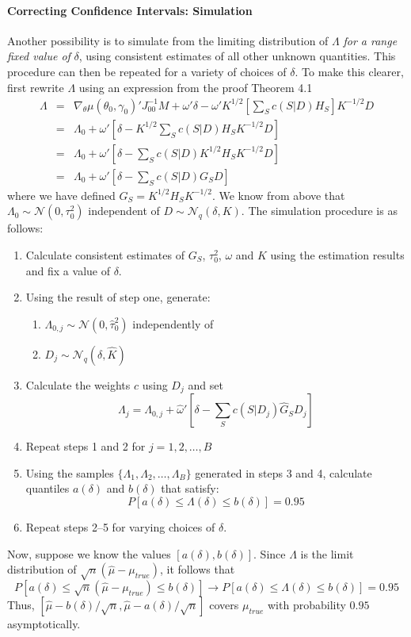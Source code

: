 \documentclass[12pt]{article}
\theoremstyle{definition}
\begin{document}
\paragraph{Correcting Confidence Intervals: Simulation} Another possibility is to simulate from the limiting distribution of $\Lambda$ \emph{for a range fixed value of} $\delta$, using consistent estimates of all other unknown quantities. This procedure can then be repeated for a variety of choices of $\delta$. To make this clearer, first rewrite $\Lambda$ using an expression from the proof Theorem 4.1
	\begin{eqnarray*}
		\Lambda &=&\nabla_{\theta}\mu(\theta_0, \gamma_0)'J_{00}^{-1}M+  \omega'\delta - \omega 'K^{1/2}\left[ \sum_S c(S|D)H_S\right] K^{-1/2}D \\
			&=& \Lambda_0 + \omega' \left[ \delta - K^{1/2} \sum_S c(S|D)H_S K^{-1/2}D \right]\\
			&=& \Lambda_0 + \omega' \left[ \delta - \sum_S c(S|D)K^{1/2} H_S K^{-1/2}D \right]\\
			&=& \Lambda_0 + \omega' \left[ \delta - \sum_S c(S|D)G_S D \right]
	\end{eqnarray*}
where we have defined $G_S = K^{1/2} H_S K^{-1/2}$. We know from above  that $\Lambda_0 \sim \mathcal{N}(0,\tau_0^2)$ independent of $D\sim \mathcal{N}_q(\delta,K)$. The simulation procedure is as follows:
		\begin{enumerate}
			\item Calculate consistent estimates of $G_S$, $\tau_0^2$, $\omega$ and $K$ using the estimation results and fix a value of $\delta$.
			\item Using the result of step one, generate:
				\begin{enumerate}
					\item $\Lambda_{0,j}\sim\mathcal{N}(0, \hat{\tau}^{2}_0)$ independently of
					\item  $D_j \sim \mathcal{N}_q(\delta, \hat{K})$
				\end{enumerate}
			\item Calculate the weights $c$ using $D_j$ and set 
				$$\Lambda_j = \Lambda_{0,j} + \hat{\omega}' \left[ \delta - \sum_S c(S|D_j)\hat{G}_S D_j \right]$$
		\item Repeat steps 1 and 2 for $j= 1, 2, \hdots, B$
		\item Using the samples $\{\Lambda_1, \Lambda_2, \hdots, \Lambda_B\}$ generated in steps 3 and 4, calculate quantiles $a(\delta)$ and $b(\delta)$ that satisfy:
			$$P\left[ a(\delta) \leq \Lambda(\delta) \leq b(\delta) \right]= 0.95$$
		\item Repeat steps 2--5 for varying choices of $\delta$.
		\end{enumerate}
Now, suppose we know the values $[a(\delta), b(\delta)]$. Since $\Lambda$ is the limit distribution of $\sqrt{n}(\hat{\mu} - \mu_{true})$, it follows that
	$$P\left[a(\delta)\leq \sqrt{n}(\hat{\mu} - \mu_{true}) \leq b(\delta)  \right]\rightarrow P\left[a(\delta)\leq \Lambda(\delta) \leq b(\delta)  \right] = 0.95$$
Thus, $\left[\hat{\mu} - b(\delta)/\sqrt{n}, \hat{\mu} - a(\delta)/\sqrt{n}  \right]$ covers $\mu_{true}$ with probability $0.95$ asymptotically.
\end{document}
